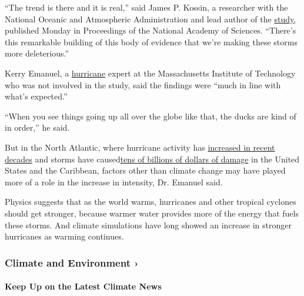 ``The trend is there and it is real,'' said James P. Kossin, a
researcher with the National Oceanic and Atmospheric Administration and
lead author of the
\href{https://www.pnas.org/cgi/doi/10.1073/pnas.1920849117}{study,}
published Monday in Proceedings of the National Academy of Sciences.
``There's this remarkable building of this body of evidence that we're
making these storms more deleterious.''

Kerry Emanuel, a
\href{https://www.nytimes3xbfgragh.onion/interactive/2020/07/25/us/hurricane-hanna-tracker-map.html}{hurricane}
expert at the Massachusetts Institute of Technology who was not involved
in the study, said the findings were ``much in line with what's
expected.''

``When you see things going up all over the globe like that, the ducks
are kind of in order,'' he said.

But in the North Atlantic, where hurricane activity has
\href{https://nca2014.globalchange.gov/report/our-changing-climate/changes-hurricanes}{increased
in recent decades} and storms have
caused\href{https://coast.noaa.gov/states/fast-facts/hurricane-costs.html}{tens
of billions of dollars of damage} in the United States and the
Caribbean, factors other than climate change may have played more of a
role in the increase in intensity, Dr. Emanuel said.

Physics suggests that as the world warms, hurricanes and other tropical
cyclones should get stronger, because warmer water provides more of the
energy that fuels these storms. And climate simulations have long showed
an increase in stronger hurricanes as warming continues.

\href{\%3Ca\%20href=\%22https://www.nytimes3xbfgragh.onion/section/climate?action=click\&pgtype=Article\&state=default\&region=MAIN_CONTENT_1\&context=storylines_keepup\%22\%3Ehttps://www.nytimes3xbfgragh.onion/section/climate?action=click\&pgtype=Article\&state=default\&region=MAIN_CONTENT_1\&context=storylines_keepup\%3C/a\%3E}{}

\hypertarget{climate-and-environment-}{%
\subsubsection{Climate and Environment
›}\label{climate-and-environment-}}

\hypertarget{keep-up-on-the-latest-climate-news}{%
\paragraph{Keep Up on the Latest Climate
News}\label{keep-up-on-the-latest-climate-news}}

